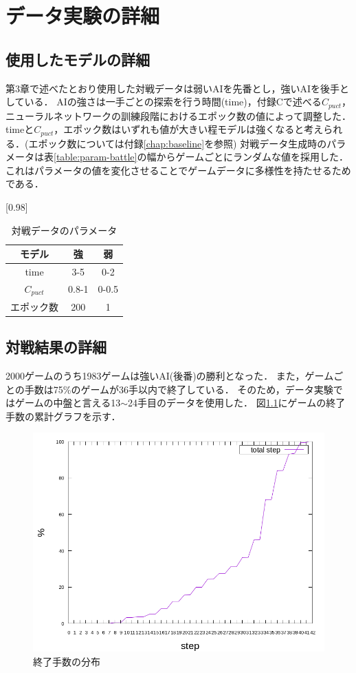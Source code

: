 \chapter{データ実験の詳細}
\label{chap:data}
\section{使用したモデルの詳細}
第3章で述べたとおり使用した対戦データは弱いAIを先番とし，強いAIを後手としている．
AIの強さは一手ごとの探索を行う時間(time)，付録Cで述べる$C_{puct}$，ニューラルネットワークの訓練段階におけるエポック数の値によって調整した．
timeと$C_{puct}$，エポック数はいずれも値が大きい程モデルは強くなると考えられる．(エポック数については付録\ref{chap:baseline}を参照)
対戦データ生成時のパラメータは表\ref{table:param-battle}の幅からゲームごとにランダムな値を採用した．
これはパラメータの値を変化させることでゲームデータに多様性を持たせるためである．
\begin{table}[H]
	\caption{対戦データのパラメータ}
	\label{table:param-battle}
	\centering
	\scalebox{0.98}[0.98]{
		\begin{tabular}{c|c|c}
			モデル&強&弱\\ \hline
			time    & 3-5 & 0-2 \\ 
			$C_{puct}$ & 0.8-1   & 0-0.5 \\
			エポック数 & 200 & 1 \\

		\end{tabular}
	}
	\label{table:battle}
\end{table}

\section{対戦結果の詳細}
2000ゲームのうち1983ゲームは強いAI(後番)の勝利となった．
また，ゲームごとの手数は75\%のゲームが36手以内で終了している．
そのため，データ実験ではゲームの中盤と言える13$\sim$24手目のデータを使用した．
図\ref{fig:stepCum}にゲームの終了手数の累計グラフを示す．
\begin{figure}[t]
	\centering
	\includegraphics[width=\linewidth]{./figure/stepCum.png}
	\caption{終了手数の分布}
	\label{fig:stepCum}
\end{figure}




